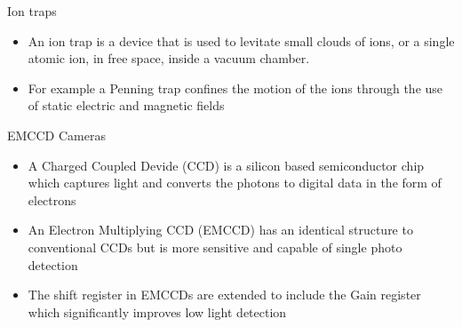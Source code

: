 \documentclass{beamer}
\begin{document}
\begin{frame}{Ion traps}

\begin{itemize}
\item An ion trap is a device that is used to levitate small clouds of ions, or  a single atomic ion, in free
space, inside a vacuum chamber.
\bigskip
\item For example a Penning trap confines the motion of the ions through the use of static electric and magnetic fields
\end{itemize}

\end{frame}

\begin{frame}{EMCCD Cameras}

\begin{itemize}
\item A Charged Coupled Devide (CCD) is a silicon based semiconductor chip  which captures light and converts the photons to digital data in the form of electrons
\bigskip
\item An Electron Multiplying CCD (EMCCD) has an identical structure to conventional CCDs but is more sensitive and capable of single photo detection
\bigskip
\item The shift register in EMCCDs are extended to include the Gain register which significantly improves low light detection
\end{itemize}

\end{frame}

\end{document}
